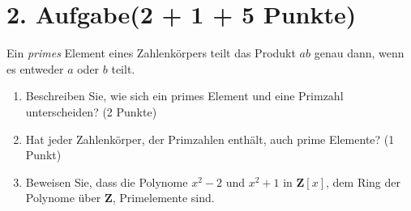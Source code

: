 \documentclass[11pt, a4paper]{article}
\begin{document}
\section*{2. Aufgabe\hfill\textnormal{\normalsize (2 + 1 + 5 Punkte)}}

Ein \emph{primes} Element eines Zahlenkörpers teilt das Produkt $ab$ genau dann, wenn es entweder $a$ oder $b$ teilt.

\begin{enumerate}
    \item Beschreiben Sie, wie sich ein primes Element und eine Primzahl unterscheiden? (2 Punkte)
    \item Hat jeder Zahlenkörper, der Primzahlen enthält, auch prime Elemente? (1 Punkt)
    \item Beweisen Sie, dass die Polynome $x^2 - 2$ und $x^2 + 1$ in $\textbf{Z}[x]$, dem Ring der Polynome über $\textbf{Z}$, Primelemente sind.
\end{enumerate}
\end{document}
